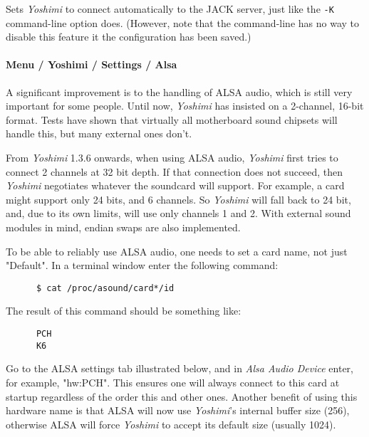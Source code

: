    Sets \textsl{Yoshimi} to connect automatically to the JACK server, just like
   the \texttt{-K} command-line option does.
   (However, note that the command-line has no way to disable this feature it
   the configuration has been saved.)

\paragraph{Menu / Yoshimi / Settings / Alsa}
\label{paragraph:menu_yoshimi_settings_alsa_tab}

   A significant improvement is to the handling of ALSA audio, which is still
   very important for some people. Until now, \textsl{Yoshimi} has insisted
   on a 2-channel, 16-bit format. Tests have shown that virtually all
   motherboard sound chipsets will handle this, but many external ones don't.

   From \textsl{Yoshimi} 1.3.6 onwards, when using ALSA audio,
   \textsl{Yoshimi} first tries to connect 2 channels at 32 bit depth.  If
   that connection does not succeed, then \textsl{Yoshimi} negotiates
   whatever the soundcard will support.  For example, a card might support
   only 24 bits, and 6 channels.  So \textsl{Yoshimi} will fall back to
   24 bit, and, due to its own limits, will use only channels 1 and 2.
   With external sound modules in mind, endian swaps are also implemented.

   To be able to reliably use ALSA audio, one needs to set a card name, not just
   "Default".  In a terminal window enter the following command:

   \begin{verbatim}
      $ cat /proc/asound/card*/id
   \end{verbatim}

   The result of this command should be something like:

   \begin{verbatim}
      PCH
      K6
   \end{verbatim}

   Go to the ALSA settings tab illustrated below, and in
   \textsl{Alsa Audio Device} enter, for example, "hw:PCH".
   This ensures one will always connect to this card at startup regardless of
   the order this and other ones.  Another benefit of using this hardware name
   is that ALSA will now use \textsl{Yoshimi}'s internal
   buffer size (256), otherwise ALSA will force \textsl{Yoshimi} to accept its
   default size (usually 1024).

